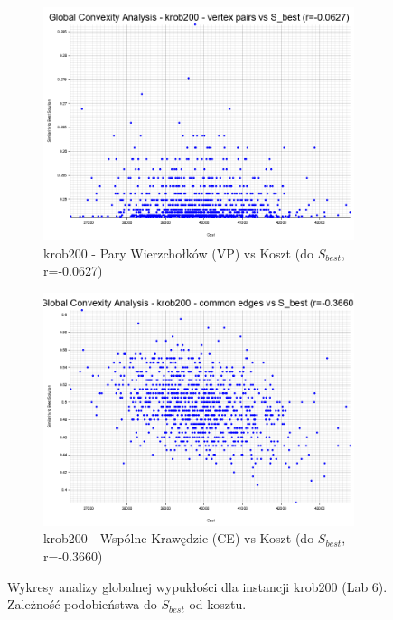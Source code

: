 \documentclass[12pt,a4paper]{article}
\begin{document}
\begin{figure}[H]
\begin{adjustwidth}{-1cm}{-1cm}
    \centering
    \begin{subfigure}[b]{0.8\textwidth}
        \centering
        \includegraphics[width=\textwidth]{output/krob200_convexity_vertex_pairs_s_best.png}
        \caption{krob200 - Pary Wierzchołków (VP) vs Koszt (do $S_{best}$, r=-0.0627)}
        \label{fig:krob200_convexity_vp_sbest}
    \end{subfigure}
    \hfill
    \begin{subfigure}[b]{0.8\textwidth}
        \centering
        \includegraphics[width=\textwidth]{output/krob200_convexity_common_edges_s_best.png}
        \caption{krob200 - Wspólne Krawędzie (CE) vs Koszt (do $S_{best}$, r=-0.3660)}
        \label{fig:krob200_convexity_ce_sbest}
    \end{subfigure}
    \caption{Wykresy analizy globalnej wypukłości dla instancji krob200 (Lab 6). Zależność podobieństwa do $S_{best}$ od kosztu.}
    \label{fig:krob200_convexity_sbest_plots}
\end{adjustwidth}
\end{figure}
\end{document}
